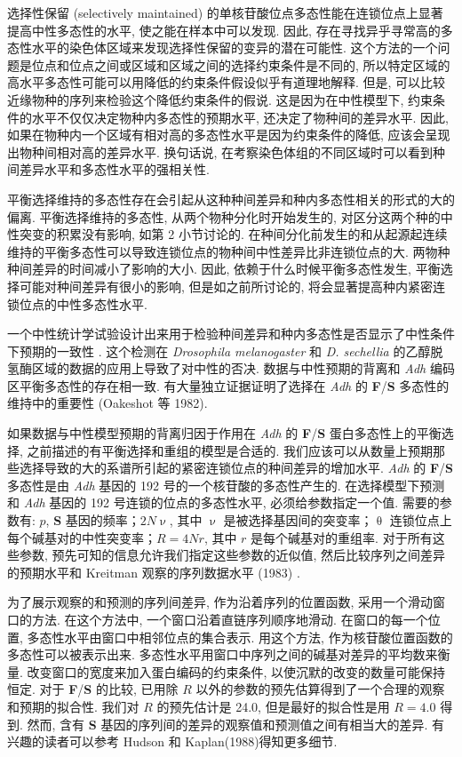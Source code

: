 \documentclass[12pt]{article}
\begin{document}
选择性保留 (selectively maintained) 的单核苷酸位点多态性能在连锁位点上显著提高中性多态性的水平,
使之能在样本中可以发现. 因此, 存在寻找异乎寻常高的多态性水平的染色体区域来发现选择性保留的变异的潜在可能性.
这个方法的一个问题是位点和位点之间或区域和区域之间的选择约束条件是不同的,
所以特定区域的高水平多态性可能可以用降低的约束条件假设似乎有道理地解释. 但是,
可以比较近缘物种的序列来检验这个降低约束条件的假说. 这是因为在中性模型下, 约束条件的水平不仅仅决定物种内多态性的预期水平,
还决定了物种间的差异水平. 因此, 如果在物种内一个区域有相对高的多态性水平是因为约束条件的降低,
应该会呈现出物种间相对高的差异水平. 换句话说, 在考察染色体组的不同区域时可以看到种间差异水平和多态性水平的强相关性.

平衡选择维持的多态性存在会引起从这种种间差异和种内多态性相关的形式的大的偏离. 平衡选择维持的多态性,
从两个物种分化时开始发生的, 对区分这两个种的中性突变的积累没有影响, 如第 2 小节讨论的.
在种间分化前发生的和从起源起连续维持的平衡多态性可以导致连锁位点的物种间中性差异比非连锁位点的大.
两物种种间差异的时间减小了影响的大小. 因此, 依赖于什么时候平衡多态性发生, 平衡选择可能对种间差异有很小的影响,
但是如之前所讨论的, 将会显著提高种内紧密连锁位点的中性多态性水平.

一个中性统计学试验设计出来用于检验种间差异和种内多态性是否显示了中性条件下预期的一致性 \parencite{hudson1987, kreitman1986}.
这个检测在 \textit{Drosophila melanogaster} 和 \textit{D.
sechellia} 的乙醇脱氢酶区域的数据的应用上导致了对中性的否决.
数据与中性预期的背离和 \textit{Adh} 编码区平衡多态性的存在相一致.
有大量独立证据证明了选择在 \textit{Adh} 的 \textbf{F}/\textbf{S} 多态性的维持中的重要性 (Oakeshot 等 1982).

如果数据与中性模型预期的背离归因于作用在 \textit{Adh} 的 \textbf{F}/\textbf{S} 蛋白多态性上的平衡选择,
之前描述的有平衡选择和重组的模型是合适的.
我们应该可以从数量上预期那些选择导致的大的系谱所引起的紧密连锁位点的种间差异的增加水平.
\textit{Adh} 的 \textbf{F}/\textbf{S} 多态性是由 \textit{Adh} 基因的 192 号的一个核苷酸的多态性产生的.
在选择模型下预测和 \textit{Adh} 基因的 192 号连锁的位点的多态性水平, 必须给参数指定一个值. 需要的参数有: $p$,
\textbf{S} 基因的频率；$2N\upnu$, 其中 $\upnu$ 是被选择基因间的突变率；$\uptheta$
连锁位点上每个碱基对的中性突变率；$R=4Nr$, 其中 $r$ 是每个碱基对的重组率. 对于所有这些参数,
预先可知的信息允许我们指定这些参数的近似值, 然后比较序列之间差异的预期水平和 Kreitman 观察的序列数据水平 (1983) .

为了展示观察的和预测的序列间差异, 作为沿着序列的位置函数, 采用一个滑动窗口的方法. 在这个方法中,
一个窗口沿着直链序列顺序地滑动. 在窗口的每一个位置, 多态性水平由窗口中相邻位点的集合表示. 用这个方法,
作为核苷酸位置函数的多态性可以被表示出来. 多态性水平用窗口中序列之间的碱基对差异的平均数来衡量.
改变窗口的宽度来加入蛋白编码的约束条件, 以使沉默的改变的数量可能保持恒定. 对于 \textbf{F}/\textbf{S} 的比较, 已用除 $R$
以外的参数的预先估算得到了一个合理的观察和预期的拟合性. 我们对 $R$ 的预先估计是 24.0, 但是最好的拟合性是用 $R=4.0$
得到. 然而, 含有 \textbf{S} 基因的序列间的差异的观察值和预测值之间有相当大的差异. 有兴趣的读者可以参考 Hudson 和
Kaplan(1988)得知更多细节.
\end{document}
